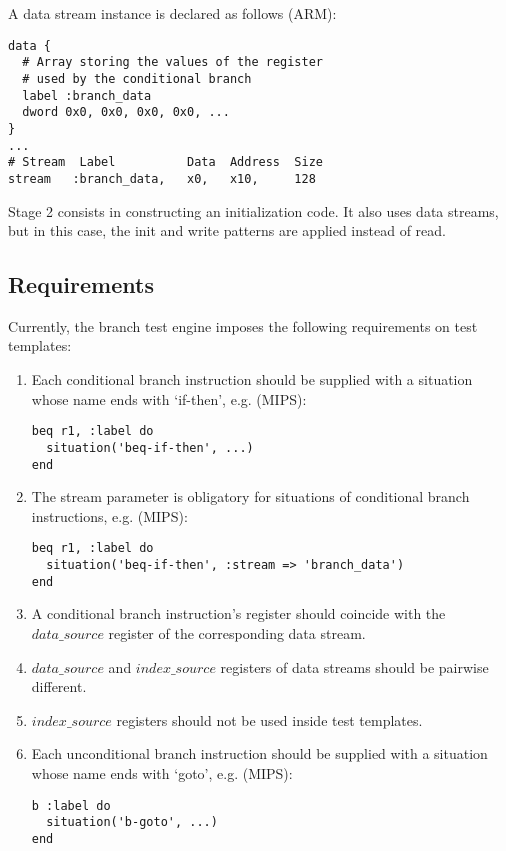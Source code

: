 A data stream instance is declared as follows (ARM):

\begin{lstlisting}
data {
  # Array storing the values of the register
  # used by the conditional branch
  label :branch_data
  dword 0x0, 0x0, 0x0, 0x0, ...
}
...
# Stream  Label          Data  Address  Size
stream   :branch_data,   x0,   x10,     128
\end{lstlisting}

Stage 2 consists in constructing an initialization code. It also uses data streams, but in this case, the init and write patterns are applied instead of read.

\subsection{Requirements}

Currently, the branch test engine imposes the following requirements on test templates:

\begin{enumerate}
\item Each conditional branch instruction should be supplied with a situation whose name ends with `if-then', e.g. (MIPS):

\begin{lstlisting}
beq r1, :label do
  situation('beq-if-then', ...)
end
\end{lstlisting}

\item The stream parameter is obligatory for situations of conditional branch instructions, e.g. (MIPS):

\begin{lstlisting}
beq r1, :label do
  situation('beq-if-then', :stream => 'branch_data')
end
\end{lstlisting}

\item A conditional branch instruction's register should coincide with the $data\_source$ register of the corresponding data stream.
\item $data\_source$ and $index\_source$ registers of data streams should be pairwise different.
\item $index\_source$ registers should not be used inside test templates.
\item Each unconditional branch instruction should be supplied with a situation whose name ends with `goto', e.g. (MIPS):

\begin{lstlisting}
b :label do
  situation('b-goto', ...)
end
\end{lstlisting}

\end{enumerate}

